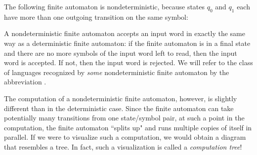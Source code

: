 \begin{example}\label{ex:nondeterministic}
The following finite automaton is nondeterministic, because states $q_{0}$ and $q_{1}$ each have more than one outgoing transition on the same symbol:
\begin{center}
\end{center}
\end{example}

A nondeterministic finite automaton accepts an input word in exactly the same way as a deterministic finite automaton: if the finite automaton is in a final state and there are no more symbols of the input word left to read, then the input word is accepted. If not, then the input word is rejected. We will refer to the class of languages recognized by \emph{some} nondeterministic finite automaton by the abbreviation \NFA.

The computation of a nondeterministic finite automaton, however, is slightly different than in the deterministic case. Since the finite automaton can take potentially many transitions from one state/symbol pair, at such a point in the computation, the finite automaton ``splits up" and runs multiple copies of itself in parallel. If we were to visualize such a computation, we would obtain a diagram that resembles a tree. In fact, such a visualization is called a \emph{computation tree}!

